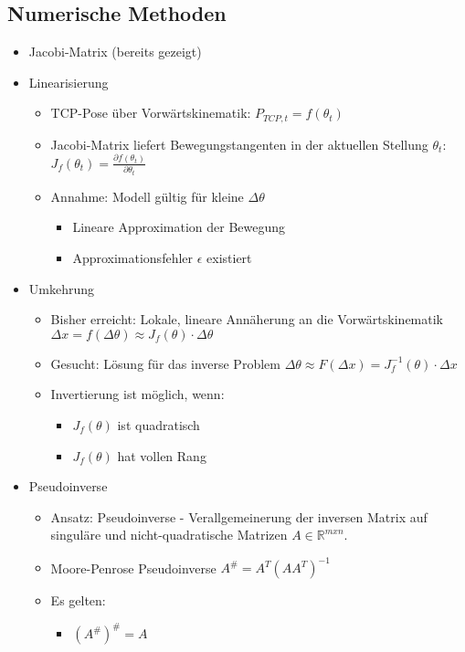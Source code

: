 \documentclass[paper=a4, fontsize=11pt]{scrartcl} %
\numberwithin{equation}{section} %
\numberwithin{figure}{section} %
\numberwithin{table}{section} %
\begin{document}
\subsection{Numerische Methoden}

\begin{itemize}
\item Jacobi-Matrix (bereits gezeigt)
\item Linearisierung
\begin{itemize}
\item TCP-Pose über Vorwärtskinematik: $P_{TCP,t} = f(\theta_t)$
\item Jacobi-Matrix liefert Bewegungstangenten in der aktuellen Stellung $\theta_t$: $J_f(\theta_t) = \frac{\partial f(\theta_t)}{\partial \theta_t}$
\item Annahme: Modell gültig für kleine $\Delta \theta$
\begin{itemize}
\item Lineare Approximation der Bewegung
\item Approximationsfehler $\epsilon$ existiert
\end{itemize}
\end{itemize}
\item Umkehrung
\begin{itemize}
\item Bisher erreicht: Lokale, lineare Annäherung an die Vorwärtskinematik $\Delta x = f(\Delta \theta) \approx J_f(\theta) \cdot \Delta \theta$
\item Gesucht: Lösung für das inverse Problem $\Delta \theta \approx F(\Delta x) = J_f^{-1}(\theta) \cdot \Delta x$
\item Invertierung ist möglich, wenn:
\begin{itemize}
\item $J_f(\theta)$ ist quadratisch
\item $J_f(\theta)$ hat vollen Rang
\end{itemize}
\end{itemize}
\item Pseudoinverse
\begin{itemize}
\item Ansatz: Pseudoinverse - Verallgemeinerung der inversen Matrix auf singuläre und nicht-quadratische Matrizen $A \in \mathbb{R}^{mxn}$.
\item Moore-Penrose Pseudoinverse $A^\# = A^T(AA^T)^{-1}$
\item Es gelten:
\begin{itemize}
\item $(A^\#)^\# = A$

\end{itemize}
\end{itemize}
\end{itemize}
\end{document}
